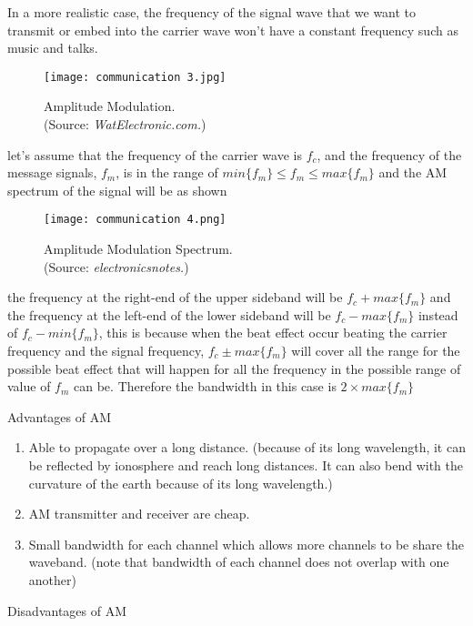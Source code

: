 \documentclass{article}
\begin{document}
In a more realistic case, the frequency of the signal wave that we want to transmit or embed into the carrier wave won't have a constant frequency such as music and talks.  
\begin{figure}[H]
    \centering
    \captionsetup{justification=centering,margin=2cm}
    \texttt{[image: communication 3.jpg]}
    \caption*{ Amplitude Modulation.\\  (Source: \textit{WatElectronic.com.})}
\end{figure}
let's assume that the frequency of the carrier wave is $f_c$, and the frequency of the message signals, $f_m$, is in the range of $min\{f_m\}\leq f_m \leq max \{f_m\}$
and the AM spectrum of the signal will be as shown
\begin{figure}[H]
    \centering
    \captionsetup{justification=centering,margin=2cm}
    \texttt{[image: communication 4.png]}
    \caption*{Amplitude Modulation Spectrum. \\  (Source: \textit{electronicsnotes.})}
\end{figure}
the frequency at the right-end of the upper sideband will be $f_c+max\{f_m\}$
and the frequency at the left-end of the lower sideband will be $f_c-max\{f_m\}$ instead of $f_c-min\{f_m\}$, this is because when the beat effect occur beating the carrier frequency and the signal frequency, $f_c \pm max \{f_m\}$ will cover all the range for the possible beat effect that will happen for all the frequency in the possible range of value of $f_m$ can be. Therefore the bandwidth in this case is $2\times max\{f_m\}$  
\begin{flushleft}
\item Advantages of AM
\end{flushleft}
\begin{enumerate}
    \item Able to propagate over a long distance. (because of its long wavelength, it can be reflected by ionosphere and reach long distances. It can also bend with the curvature of the earth because of its long wavelength.)
    \item AM transmitter and receiver are cheap.
    \item Small bandwidth for each channel which allows more channels to be share the waveband. (note that bandwidth of each channel does not overlap with one another)
\end{enumerate}
\begin{flushleft}
\item Disadvantages of AM
\end{flushleft}
\end{document}
